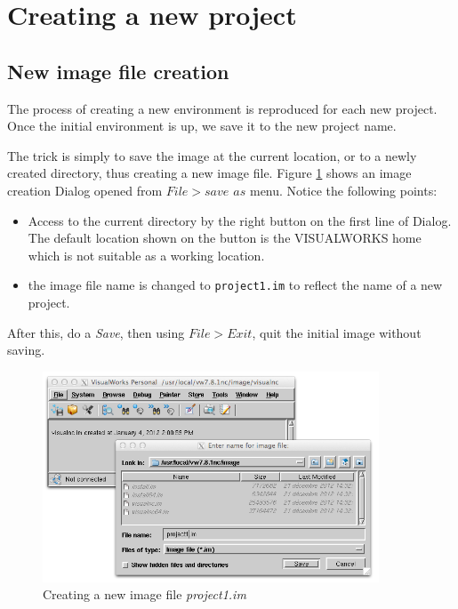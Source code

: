 \documentclass[times,a4paper]{book}
\begin{document}
\section {Creating a new project }
\subsection {New image file creation }

The process of creating a new environment is reproduced for each new project. Once the initial 
environment is up, we save it to the new project name.

The trick is simply to save the image at the current location, or to a newly created directory,
thus creating a new image file. Figure 
\ref{fig:startInit-newEnv} shows an image creation Dialog opened from {\sl $File>save$ $as$} menu.
Notice the following points:
\begin{itemize}
\item Access to the current directory by the right button on the first line of Dialog.
The default location shown on the button is the VISUALWORKS home which is not suitable as a working location.

\item the image file name is changed to {\tt project1.im} to reflect the name of a new project.
\end{itemize}
After this, do a {\sl Save}, then using {\sl $File>Exit$}, quit the initial image without saving.
 
\begin{figure}[hbtp]
\begin{center} 
\includegraphics[width=10cm]{startInit-newEnv.png}
\caption{Creating a new image file {\sl project1.im} }
\label{fig:startInit-newEnv}
\end{center}
\end{figure}
\end{document}
